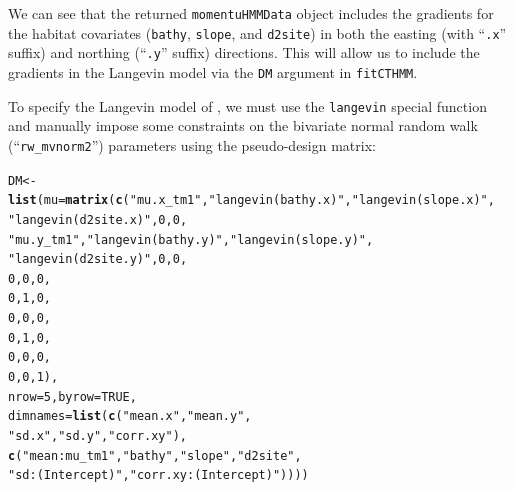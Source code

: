 \documentclass[12pt]{article}\usepackage[]{graphicx}\usepackage[]{xcolor}
\makeatletter
\newcommand{\hlnum}[1]{\textcolor[rgb]{0.686,0.059,0.569}{#1}}%
\newcommand{\hlsng}[1]{\textcolor[rgb]{0.192,0.494,0.8}{#1}}%
\newcommand{\hldef}[1]{\textcolor[rgb]{0.345,0.345,0.345}{#1}}%
\newcommand{\hlkwb}[1]{\textcolor[rgb]{0.69,0.353,0.396}{#1}}%
\newcommand{\hlkwc}[1]{\textcolor[rgb]{0.333,0.667,0.333}{#1}}%
\newcommand{\hlkwd}[1]{\textcolor[rgb]{0.737,0.353,0.396}{\textbf{#1}}}%
\newenvironment{kframe}{%
 \def\at@end@of@kframe{}%
 \ifinner\ifhmode%
  \def\at@end@of@kframe{\end{minipage}}%
  \begin{minipage}{\columnwidth}%
 \fi\fi%
 \def\FrameCommand##1{\hskip\@totalleftmargin \hskip-\fboxsep
 \colorbox{shadecolor}{##1}\hskip-\fboxsep
     \hskip-\linewidth \hskip-\@totalleftmargin \hskip\columnwidth}%
 \MakeFramed {\advance\hsize-\width
   \@totalleftmargin\z@ \linewidth\hsize
   \@setminipage}}%
 {\par\unskip\endMakeFramed%
 \at@end@of@kframe}
\newenvironment{knitrout}{}{} %
\makeatother
\begin{document}
\noindent We can see that the returned \verb|momentuHMMData| object includes the gradients for the habitat covariates (\verb|bathy|, \verb|slope|, and \verb|d2site|) in both the easting (with ``\verb|.x|'' suffix) and northing (``\verb|.y|'' suffix) directions. This will allow us to include the gradients in the Langevin model via the \verb|DM| argument in \verb|fitCTHMM|. 

To specify the Langevin model of \citet{MichelotEtAl2019}, we must use the \verb|langevin| special function and manually impose some constraints on the bivariate normal random walk (``\verb|rw_mvnorm2|'') parameters using the pseudo-design matrix:
\begin{knitrout}
\color{fgcolor}\begin{kframe}
\begin{alltt}
\hldef{DM} \hlkwb{<-} \hlkwd{list}\hldef{(}\hlkwc{mu}\hldef{=}\hlkwd{matrix}\hldef{(}\hlkwd{c}\hldef{(}\hlsng{"mu.x_tm1"}\hldef{,}\hlsng{"langevin(bathy.x)"}\hldef{,}\hlsng{"langevin(slope.x)"}\hldef{,}
                       \hlsng{"langevin(d2site.x)"}\hldef{,}\hlnum{0}\hldef{,}\hlnum{0}\hldef{,}
                       \hlsng{"mu.y_tm1"}\hldef{,}\hlsng{"langevin(bathy.y)"}\hldef{,}\hlsng{"langevin(slope.y)"}\hldef{,}
                       \hlsng{"langevin(d2site.y)"}\hldef{,}\hlnum{0}\hldef{,}\hlnum{0}\hldef{,}
                                \hlnum{0}\hldef{,}                  \hlnum{0}\hldef{,}                  \hlnum{0}\hldef{,}
                                          \hlnum{0}\hldef{,}\hlnum{1}\hldef{,}\hlnum{0}\hldef{,}
                                \hlnum{0}\hldef{,}                  \hlnum{0}\hldef{,}                  \hlnum{0}\hldef{,}
                                          \hlnum{0}\hldef{,}\hlnum{1}\hldef{,}\hlnum{0}\hldef{,}
                                \hlnum{0}\hldef{,}                  \hlnum{0}\hldef{,}                  \hlnum{0}\hldef{,}
                                          \hlnum{0}\hldef{,}\hlnum{0}\hldef{,}\hlnum{1}\hldef{),}
                     \hlkwc{nrow}\hldef{=}\hlnum{5}\hldef{,}\hlkwc{byrow}\hldef{=}\hlnum{TRUE}\hldef{,}
                     \hlkwc{dimnames} \hldef{=} \hlkwd{list}\hldef{(}\hlkwd{c}\hldef{(}\hlsng{"mean.x"}\hldef{,}\hlsng{"mean.y"}\hldef{,}
                                       \hlsng{"sd.x"}\hldef{,}\hlsng{"sd.y"}\hldef{,}\hlsng{"corr.xy"}\hldef{),}
                     \hlkwd{c}\hldef{(}\hlsng{"mean:mu_tm1"}\hldef{,}\hlsng{"bathy"}\hldef{,}\hlsng{"slope"}\hldef{,}\hlsng{"d2site"}\hldef{,}
                       \hlsng{"sd:(Intercept)"}\hldef{,}\hlsng{"corr.xy:(Intercept)"}\hldef{))))}

\end{alltt}
\end{kframe}
\end{knitrout}
\end{document}
